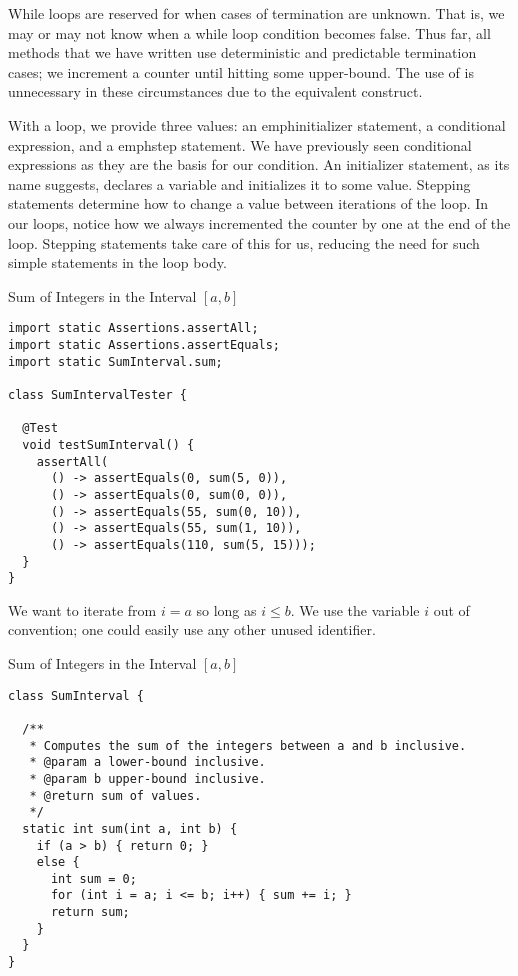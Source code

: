 While loops are reserved for when cases of termination are unknown. That is, we may or may not know when a while loop condition becomes false. Thus far, all methods that we have written use deterministic and predictable termination cases; we increment a counter until hitting some upper-bound. The use of  is unnecessary in these circumstances due to the equivalent  construct.

With a  loop, we provide three values: an emph{initializer statement}, a conditional expression, and a emph{step statement}. We have previously seen conditional expressions as they are the basis for our  condition. An initializer statement, as its name suggests, declares a variable and initializes it to some value. Stepping statements determine how to change a value between iterations of the loop. In our  loops, notice how we always incremented the counter by one at the end of the loop. Stepping statements take care of this for us, reducing the need for such simple statements in the loop body.


\begin{cl}{Sum of Integers in the Interval $[a, b]$}
\begin{lstlisting}[language=MyJava]
import static Assertions.assertAll;
import static Assertions.assertEquals;
import static SumInterval.sum;

class SumIntervalTester {

  @Test
  void testSumInterval() {
    assertAll(
      () -> assertEquals(0, sum(5, 0)),
      () -> assertEquals(0, sum(0, 0)),
      () -> assertEquals(55, sum(0, 10)),
      () -> assertEquals(55, sum(1, 10)),
      () -> assertEquals(110, sum(5, 15)));
  }
}
\end{lstlisting}
\end{cl}

We want to iterate from $i = a$ so long as $i \leq b$. We use the variable $i$ out of convention; one could easily use any other unused identifier.

\begin{cl}{Sum of Integers in the Interval $[a, b]$}
\begin{lstlisting}[language=MyJava]
class SumInterval {

  /**
   * Computes the sum of the integers between a and b inclusive.
   * @param a lower-bound inclusive.
   * @param b upper-bound inclusive.
   * @return sum of values.
   */
  static int sum(int a, int b) {
    if (a > b) { return 0; } 
    else {
      int sum = 0;
      for (int i = a; i <= b; i++) { sum += i; }
      return sum;
    }
  }
}
\end{lstlisting}
\end{cl}

